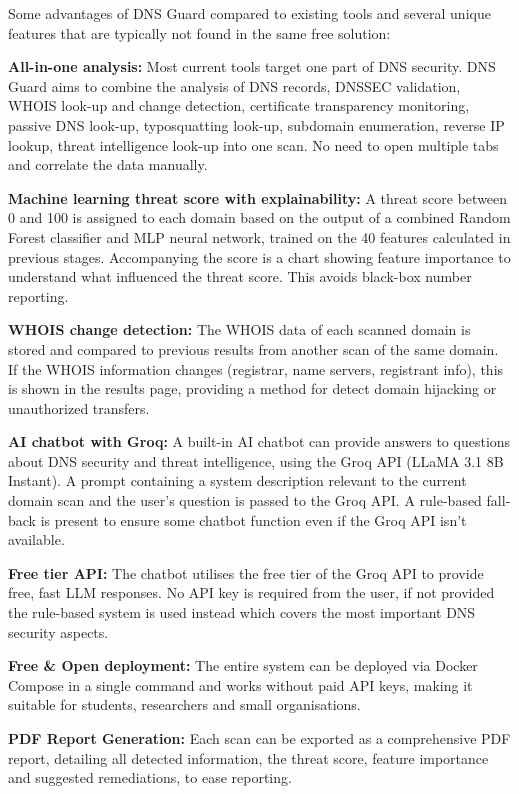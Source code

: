 \documentclass[12pt, a4paper, oneside]{report}
\begin{document}
Some advantages of DNS Guard compared to existing tools and several unique features that are typically not found in the same free solution:

\textbf{All-in-one analysis:} Most current tools target one part of DNS security. DNS Guard aims to combine the analysis of DNS records, DNSSEC validation, WHOIS look-up and change detection, certificate transparency monitoring, passive DNS look-up, typosquatting look-up, subdomain enumeration, reverse IP lookup, threat intelligence look-up into one scan. No need to open multiple tabs and correlate the data manually.

\textbf{Machine learning threat score with explainability:} A threat score between 0 and 100 is assigned to each domain based on the output of a combined Random Forest classifier and MLP neural network, trained on the 40 features calculated in previous stages. Accompanying the score is a chart showing feature importance to understand what influenced the threat score. This avoids black-box number reporting.

\textbf{WHOIS change detection:} The WHOIS data of each scanned domain is stored and compared to previous results from another scan of the same domain. If the WHOIS information changes (registrar, name servers, registrant info), this is shown in the results page, providing a method for detect domain hijacking or unauthorized transfers.

\textbf{AI chatbot with Groq:} A built-in AI chatbot can provide answers to questions about DNS security and threat intelligence, using the Groq API (LLaMA 3.1 8B Instant). A prompt containing a system description relevant to the current domain scan and the user's question is passed to the Groq API. A rule-based fall-back is present to ensure some chatbot function even if the Groq API isn't available.

\textbf{Free tier API:} The chatbot utilises the free tier of the Groq API to provide free, fast LLM responses. No API key is required from the user, if not provided the rule-based system is used instead which covers the most important DNS security aspects.

\textbf{Free \& Open deployment:} The entire system can be deployed via Docker Compose in a single command and works without paid API keys, making it suitable for students, researchers and small organisations.

\textbf{PDF Report Generation:} Each scan can be exported as a comprehensive PDF report, detailing all detected information, the threat score, feature importance and suggested remediations, to ease reporting.
\end{document}
